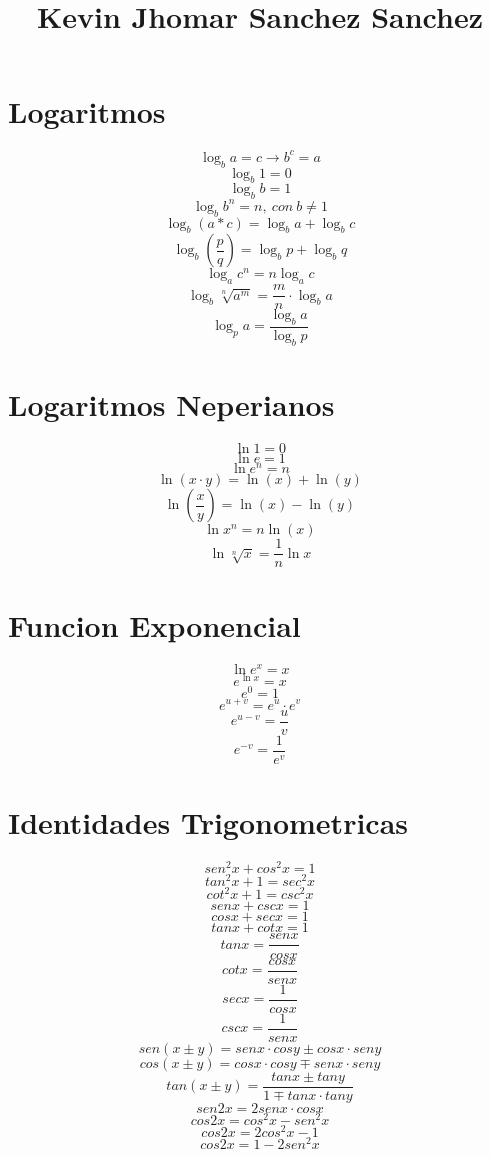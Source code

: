 \documentclass[11pt, conference]{IEEEtran}
\begin{document}
	\title{\bf Kevin Jhomar Sanchez Sanchez}
	\maketitle
	
\section{Logaritmos}
\[\log_ba = c\longrightarrow b^c=a\]
\[\log_b1 = 0\]
\[\log_bb = 1\]
\[\log_bb^n = n,\ con\ b\neq 1\]
\[\log_b(a*c) = \log_ba + \log_bc\]
\[\log_b\left(\frac{p}{q}\right) = \log_bp + \log_bq\]
\[\log_ac^n = n\log_ac\]
\[\log_b\sqrt[n]{a^m} = \frac{m}{n}\cdot\log_ba\]
\[\log_pa = \frac{\log_ba}{\log_bp}\]
\section{Logaritmos Neperianos}
\[\ln1=0\]
\[\ln e=1\]
\[\ln e^n=n\]
\[\ln(x\cdot y)=\ln(x) + \ln(y)\]
\[\ln\left(\frac{x}{y}\right)=\ln(x) - \ln(y)\]
\[\ln x^n=n\ln(x)\]
\[\ln\sqrt[n]{x}=\frac{1}{n}\ln x\]
\section{Funcion Exponencial}
\[\ln e^x=x\]
\[e^{\ln x}=x\]
\[e^0=1\]
\[e^{u+v}=e^u\cdot e^v\]
\[e^{u-v}=\frac{u}{v}\]
\[e^{-v}=\frac{1}{e^v}\]
\section{Identidades Trigonometricas}
\[sen^2x+cos^2x = 1\]
\[tan^2x+1 = sec^2x\]
\[cot^2x+1 = csc^2x\]
\[senx+cscx = 1\]
\[cosx+secx = 1\]
\[tanx+cotx = 1\]
\[tanx = \frac{senx}{cosx}\]
\[cotx = \frac{cosx}{senx}\]
\[secx = \frac{1}{cosx}\]
\[cscx = \frac{1}{senx}\]
\[sen(x\pm y) = senx\cdot cosy \pm cosx\cdot seny\]
\[cos(x\pm y) = cosx\cdot cosy \mp senx\cdot seny\]
\[tan(x\pm y) = \frac{tanx\pm tany}{1\mp tanx\cdot tany}\]
\[sen2x=2senx\cdot cosx\]
\[cos2x=cos^2x-sen^2x\]
\[cos2x=2cos^2x-1\]
\[cos2x=1-2sen^2x\]
\pagebreak
\onecolumn
\end{document}
